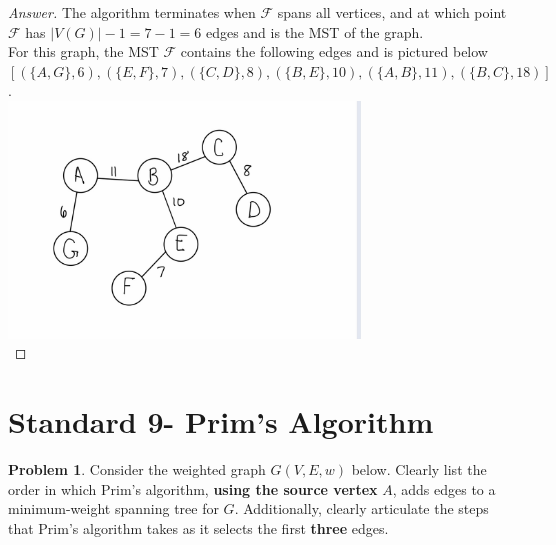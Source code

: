 \documentclass[11pt]{article}
\theoremstyle{definition}
\theoremstyle{definition}
\newtheorem{required}{Problem}
\theoremstyle{definition}
\begin{document}
\begin{proof}[Answer]
The algorithm terminates when $\mathcal{F}$ spans all vertices, and at which point $\mathcal{F}$ has $|V(G)|-1 = 7-1= 6$ edges and is the MST of the graph. \\
For this graph, the MST $\mathcal{F}$ contains the following edges and is pictured below \\
$ [(\{A,G\}, 6), (\{E,F\}, 7), (\{C,D\}, 8), (\{B,E\}, 10), (\{A,B\}, 11),  (\{B,C\}, 18)]$. \\
\includegraphics[width=0.7\textwidth]{hw3problem34} \\


\end{proof}


\newpage
\section{Standard 9- Prim's Algorithm}

\begin{required}
Consider the weighted graph $G(V, E, w)$ below. Clearly list the order in which Prim's algorithm, \textbf{using the source vertex} $A$, adds edges to a minimum-weight spanning tree for $G$. Additionally, clearly articulate the steps that Prim's algorithm takes as it selects the first \textbf{three} edges.

\begin{center}
\end{center}
\end{required}
\end{document}

